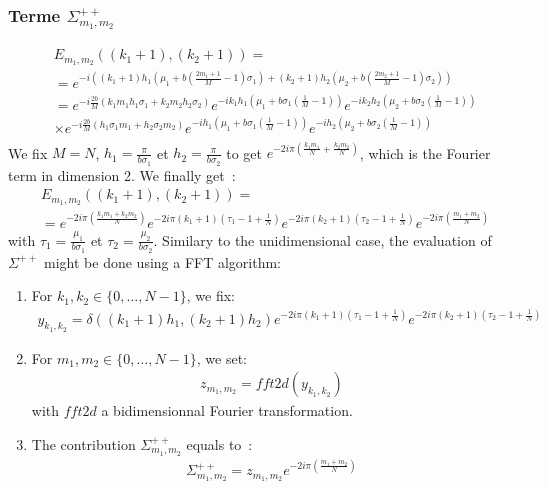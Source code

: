 \subsubsection{Terme $\Sigma_{m_1,m_2}^{++}$}
\begin{align*}
&E_{m_1,m_2}((k_1+1),(k_2+1))=\\
&=e^{-i\left((k_1+1)h_1\left(\mu_1+b\left(\frac{2m_1+1}{M}-1\right)\sigma_1\right)+(k_2+1)h_2\left(\mu_2+b\left(\frac{2m_2+1}{M}-1\right)\sigma_2\right)\right)}\\
&=e^{-i\frac{2b}{M}\left(k_1m_1h_1\sigma_1+k_2m_2h_2\sigma_2\right)}e^{-ik_1h_1\left(\mu_1+b\sigma_1\left(\frac{1}{M}-1\right)\right)}e^{-ik_2h_2\left(\mu_2+b\sigma_2\left(\frac{1}{M}-1\right)\right)}\\
&\times e^{-i\frac{2b}{M}\left(h_1\sigma_1 m_1+h_2\sigma_2 m_2\right)}e^{-ih_1\left(\mu_1+b\sigma_1\left(\frac{1}{M}-1\right)\right)}e^{-ih_2\left(\mu_2+b\sigma_2\left(\frac{1}{M}-1\right)\right)}\\
\end{align*}
We fix $M=N$, $h_1=\frac{\pi}{b\sigma_1}$ et $h_2=\frac{\pi}{b\sigma_2}$ to get $e^{-2i\pi\left(\frac{k_1m_1}{N}+\frac{k_2m_2}{N}\right)}$, which is the Fourier term in dimension 2. We finally get~:
\begin{align*}
&E_{m_1,m_2}((k_1+1),(k_2+1))=\\
&=e^{-2i\pi\left(\frac{k_1m_1+k_2m_2}{N}\right)}e^{-2i\pi (k_1+1)\left(\tau_1-1+\frac{1}{N}\right)}e^{-2i\pi (k_2+1)\left(\tau_2-1+\frac{1}{N}\right)}e^{-2i\pi\left(\frac{m_1+m_2}{N}\right)}
\end{align*}
with $\tau_1=\frac{\mu_1}{b\sigma_1}$ et $\tau_2=\frac{\mu_2}{b\sigma_2}$.
Similary to the unidimensional case, the evaluation of $\Sigma^{++}$ might be done using a FFT algorithm:
\begin{enumerate}
\item For $k_1,k_2\in\{0,\hdots,N-1\}$, we fix:
\begin{align*}
y_{k_1,k_2}=\delta((k_1+1)h_1,(k_2+1)h_2)e^{-2i\pi (k_1+1)\left(\tau_1-1+\frac{1}{N}\right)}e^{-2i\pi (k_2+1)\left(\tau_2-1+\frac{1}{N}\right)}
\end{align*}
\item For $m_1,m_2\in\{0,\hdots,N-1\}$, we set:
\begin{align*}
  z_{m_1,m_2}=fft2d(y_{k_1,k_2})
\end{align*}
with $fft2d$ a bidimensionnal Fourier transformation.
\item The contribution $\Sigma_{m_1,m_2}^{++}$ equals to~:
\begin{align*}
  \Sigma_{m_1,m_2}^{++}=z_{m_1,m_2}e^{-2i\pi\left(\frac{m_1+m_2}{N}\right)}
\end{align*}
\end{enumerate}

